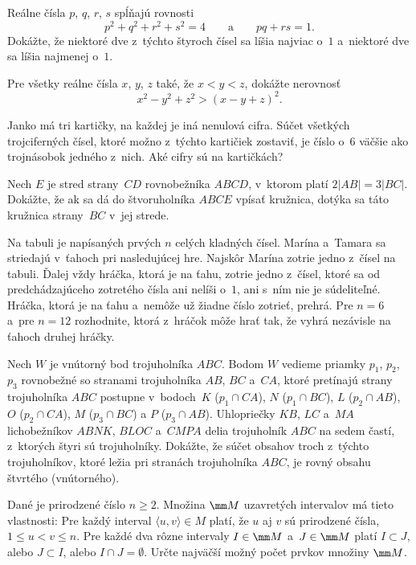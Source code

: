 {%
Reálne čísla $p$, $q$, $r$, $s$ spĺňajú rovnosti
$$
p^2+q^2+r^2+s^2=4\qquad\text{a}\qquad pq+rs=1.
$$
Dokážte, že niektoré dve z~týchto štyroch čísel sa líšia najviac o~$1$
a~niektoré dve sa líšia najmenej o~$1$.}

{%
Pre všetky reálne čísla $x$, $y$, $z$ také, že $x<y<z$, dokážte nerovnosť
$$
x^2-y^2+z^2>(x-y+z)^2.
$$
}

{%
Janko má tri kartičky, na každej je iná nenulová cifra. Súčet
všetkých trojciferných čísel, ktoré možno z~týchto kartičiek
zostaviť, je číslo o~$6$ väčšie ako trojnásobok jedného z~nich.
Aké cifry sú na kartičkách?}

{%
Nech $E$ je stred strany~$CD$ rovnobežníka $ABCD$, v~ktorom
platí $2|AB|=3|BC|$. Dokážte, že ak sa dá do štvoruholníka $ABCE$ vpísať
kružnica, dotýka sa táto kružnica strany~$BC$ v~jej strede.}

{%
Na tabuli je napísaných prvých $n$ celých kladných čísel. Marína
a~Tamara sa striedajú v~ťahoch pri nasledujúcej hre. Najskôr
Marína zotrie jedno z~čísel na tabuli. Ďalej vždy hráčka, ktorá
je na ťahu, zotrie jedno z~čísel, ktoré sa od predchádzajúceho
zotretého čísla ani nelíši o~$1$, ani s~ním nie je súdeliteľné. Hráčka,
ktorá je na ťahu a~nemôže už žiadne číslo zotrieť, prehrá.
Pre $n=6$ a~pre $n=12$ rozhodnite, ktorá z~hráčok môže hrať tak,
že vyhrá nezávisle na ťahoch druhej hráčky.}

{%
Nech $W$ je vnútorný bod trojuholníka $ABC$. Bodom $W$ vedieme priamky $p_1$, $p_2$, $p_3$
rovnobežné so stranami trojuholníka $AB$, $BC$ a~$CA$, ktoré pretínajú strany trojuholníka
$ABC$ postupne v~bodoch~$K$ ($p_1 \cap CA$), $N$ ($p_1 \cap BC$), $L$ ($p_2 \cap AB$), $O$ ($p_2 \cap CA$), $M$ ($p_3 \cap BC$)
a $P$ ($p_3 \cap AB$). Uhlopriečky $KB$, $LC$ a~$MA$ lichobežníkov $ABNK$, $BLOC$ a~$CMPA$  delia trojuholník
$ABC$ na sedem častí, z~ktorých štyri sú trojuholníky. Dokážte, že súčet obsahov troch z~týchto trojuholníkov, ktoré ležia pri stranách trojuholníka $ABC$, je rovný obsahu štvrtého (vnútorného).}

{%
Dané je prirodzené číslo $n\ge2$. Množina $\mm M$ uzavretých intervalov má tieto vlastnosti:
\itemitem Pre každý interval $\langle u, v \rangle \in M$ platí, že $u$ aj $v$ sú prirodzené čísla, $1 \le u < v \le n$.
\itemitem Pre každé dva rôzne intervaly $I \in\mm M$ a~$J \in\mm M$ platí $I \subset J$, alebo $J \subset I$, alebo $I \cap J = \emptyset$.
\endgraf
\noindent
Určte najväčší možný počet prvkov množiny $\mm M$.}

